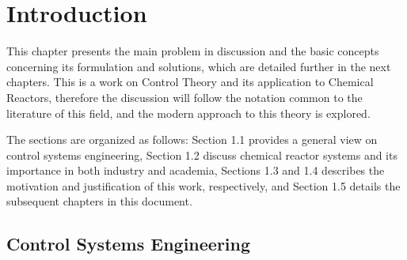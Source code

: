 \documentclass[a4paper,11pt]{book}
\numberwithin{figure}{chapter}
\numberwithin{equation}{chapter}
\numberwithin{table}{chapter}
\theoremstyle{definition}
\begin{document}
\thispagestyle{empty}   
\frontmatter
\setcounter{secnumdepth}{1}
\setcounter{tocdepth}{1}
\tableofcontents
\newpage

%
\listoffigures%
\newpage

%
\listoftables
\newpage

\clearpage
\mainmatter
\setcounter{page}{1}
\chapter{Introduction}

This chapter presents the main problem in discussion and the basic concepts concerning its formulation and solutions, which are detailed further in the next chapters. This is a work on Control Theory and its application to Chemical Reactors, therefore the discussion will follow the notation common to the literature of this field, and the modern approach to this theory is explored. 

The sections are organized as follows: Section 1.1 provides a general view on control systems engineering, Section 1.2 discuss chemical reactor systems and its importance in both industry and academia, Sections 1.3 and 1.4 describes the motivation and justification of this work, respectively, and Section 1.5 details the subsequent chapters in this document.

\section{Control Systems Engineering}
\end{document}
